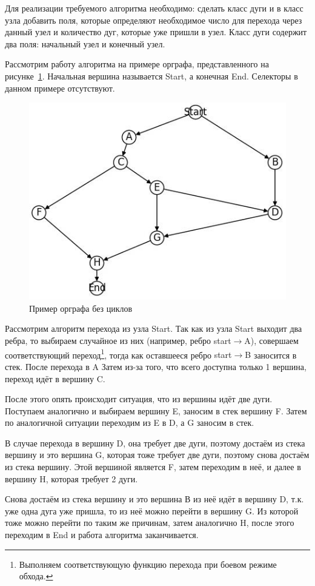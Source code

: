 Для реализации требуемого алгоритма необходимо: сделать класс дуги и в класс узла добавить поля, которые определяют необходимое число для перехода через данный узел и количество дуг, которые уже пришли в узел. Класс дуги содержит два поля: начальный узел и конечный узел.

Рассмотрим работу алгоритма на примере орграфа, представленного на рисунке~\ref{fig:graph}. Начальная вершина называется \textsf{Start}, а конечная \textsf{End}. Селекторы в данном примере отсутствуют.%

\begin{figure}[h]
    \centering
    \includegraphics[width=0.55\linewidth]{ResearchNotes/rndhpc_alg_edt_2023_02_01/graph.jpg}
    \caption{Пример орграфа без циклов}
    \label{fig:graph}
\end{figure}

Рассмотрим алгоритм перехода из узла \textsf{Start}. Так как из узла \textsf{Start} выходит два ребра, то выбираем случайное из них (например, ребро \textsf{start$\rightarrow$A}), совершаем соответствующий переход\footnote{Выполняем соответствующую функцию перехода при \flqq боевом \frqq режиме обхода.}, тогда как оставшееся ребро \textsf{start$\rightarrow$B} заносится в стек. После перехода в \textsf{A}  Затем из-за того, что всего доступна только 1 вершина, переход идёт в вершину \textsf{C}.

После этого опять происходит ситуация, что из вершины идёт две дуги. Поступаем аналогично и выбираем вершину \textsf{E}, заносим в стек вершину \textsf{F}. Затем по аналогичной ситуации переходим из \textsf{E} в \textsf{D}, а \textsf{G} заносим в стек.

В случае перехода в вершину \textsf{D}, она требует две дуги, поэтому достаём из стека вершину и это вершина \textsf{G}, которая тоже требует две дуги, поэтому снова достаём из стека вершину. Этой вершиной является \textsf{F}, затем переходим в неё, и далее в вершину \textsf{H}, которая требует 2 дуги.

Снова достаём из стека вершину и это вершина \textsf{В} из неё идёт в вершину \textsf{D}, т.к. уже одна дуга уже пришла, то из неё можно перейти в вершину \textsf{G}. Из которой тоже можно перейти по таким же причинам, затем аналогично \textsf{H}, после этого переходим в \textsf{End} и работа алгоритма заканчивается.

\noteattributes{} 